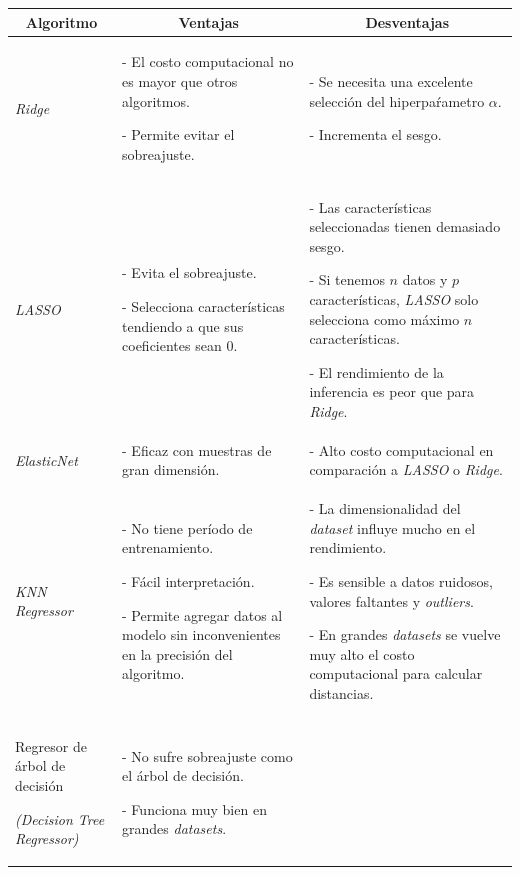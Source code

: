 \documentclass[a4paper,12pt]{article}
\begin{document}
\begin{landscape}
	
	\begin{table}[]
		\centering
		\begin{tabularx}{\hsize}{|X|X|X|}
			\hline
			\multicolumn{1}{|c|}{\textbf{Algoritmo}} & \multicolumn{1}{|c|}{\textbf{Ventajas}} & \multicolumn{1}{|c|}{\textbf{Desventajas}} \\
			\hline
			\textit{Ridge}   & 
			- El costo computacional no es mayor que otros algoritmos.
			
			- Permite evitar el sobreajuste. & 
			- Se necesita una excelente selección del hiperpaŕametro $\alpha$. 
			
			- Incrementa el sesgo.
			\\ \hline
			\textit{LASSO}      & 
			- Evita el sobreajuste. 
			
			- Selecciona características tendiendo a que sus coeficientes sean 0. & 
			- Las características seleccionadas tienen demasiado sesgo. 
			
			- Si tenemos $n$ datos y $p$ características, \textit{LASSO} solo selecciona como máximo $n$ características. 
			
			- El rendimiento de la inferencia es peor que para \textit{Ridge}.
			
			\\ \hline
			\textit{ElasticNet}           & 
			- Eficaz con muestras de gran dimensión.
			 & 
			- Alto costo computacional en comparación a \textit{LASSO} o \textit{Ridge}.
			\\ \hline
			\textit{KNN Regressor} & 
			- No tiene período de entrenamiento.
			
			- Fácil interpretación.
			
			- Permite agregar datos al modelo sin inconvenientes en la precisión del algoritmo.
			&
			- La dimensionalidad del \textit{dataset} influye mucho en el rendimiento.
			
			- Es sensible a datos ruidosos, valores faltantes y \textit{outliers}.
			
			- En grandes \textit{datasets} se vuelve muy alto el costo computacional para calcular distancias.			
			
			\\ \hline
			Regresor de árbol de decisión
			
			\textit{(Decision Tree Regressor)} & 
			- No sufre sobreajuste como el árbol de decisión.
			
			- Funciona muy bien en grandes \textit{datasets}. 
			

\end{tabularx}
\end{table}
\end{landscape}
\end{document}
